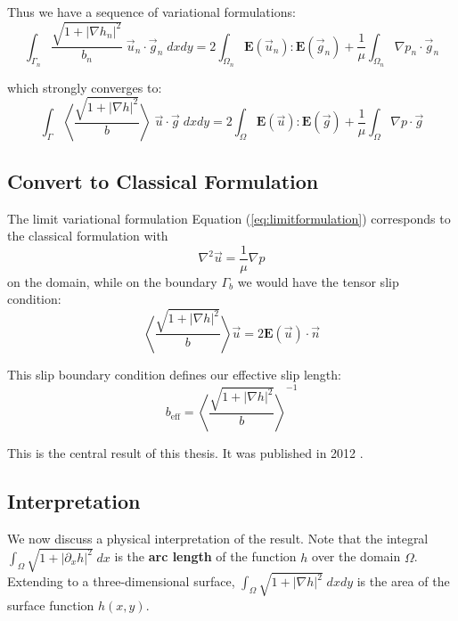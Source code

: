 \documentclass[12pt, a4paper, twoside, openright]{book}
\newcommand{\beff}{\ensuremath{b_{\mathrm{eff}}}}
\begin{document}
Thus we have a sequence of variational formulations:
\begin{equation}
\int_{\Gamma_n} \frac{\sqrt{1 + \lvert \nabla h_n \rvert^2}}{b_n} \;
\vec{u}_n \cdot \vec{g}_n\;dxdy = 
2 \int_{\Omega_n} \mathbf{E}(\vec{u}_n) : \mathbf{E}(\vec{g}_n) +
\frac{1}{\mu} \int_{\Omega_n}  \nabla p_n \cdot \vec{g}_n
\end{equation}

which strongly converges to:
\begin{equation}
\int_{\Gamma} \left< \frac{\sqrt{1 + \lvert \nabla h \rvert^2}}{b} \right> \;
\vec{u} \cdot \vec{g} \;dxdy = 
2 \int_{\Omega} \mathbf{E}(\vec{u}) : \mathbf{E}(\vec{g}) +
\frac{1}{\mu} \int_{\Omega}  \nabla p \cdot \vec{g}
\label{eq:limitformulation}
\end{equation}




\subsection{Convert to Classical Formulation}
The limit variational formulation Equation (\ref{eq:limitformulation}) corresponds to the classical formulation with
\begin{equation}
\nabla^2 \vec{u} = \frac{1}{\mu} \nabla p
\end{equation}
on the domain, while on the boundary $\Gamma_b$ we would have the tensor slip condition:
\begin{equation}
\left< \frac{\sqrt{1 + \lvert \nabla h \rvert^2}}{b} \right> \vec{u} = 2 \mathbf{E}(\vec{u}) \cdot \vec{n}
\end{equation}

This slip boundary condition defines our effective slip length:
\begin{equation}
\beff = \left< \frac{\sqrt{1 + \lvert \nabla h \rvert^2}}{b} \right> ^{-1}
\label{eq:homogharm}
\end{equation}

This is the central result of this thesis.  It was published in 2012 \cite{Lund2012}.

\clearpage
\subsection{Interpretation}
We now discuss a physical interpretation of the result.
Note that the integral $\int_{\Omega} \sqrt{1 + \lvert \partial_x h \rvert^2} \; dx$ is the \textbf{arc length} of the function $h$ over the domain $\Omega$.  Extending to a three-dimensional surface,  $\int_{\Omega} \sqrt{1 + \lvert \nabla h \rvert^2} \; dxdy$ is the area of the surface function $h(x,y)$.
\end{document}
